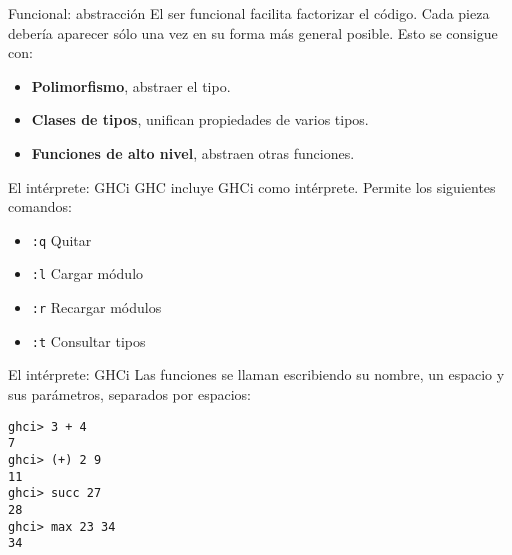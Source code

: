 \begin{frame}[fragile]{Funcional: abstracción}
  El ser funcional facilita factorizar el código. Cada
  pieza debería aparecer sólo una vez en su forma más
  general posible. Esto se consigue con:
  
  \begin{itemize}
   \item \textbf{Polimorfismo}, abstraer el tipo.
   \item \textbf{Clases de tipos}, unifican propiedades de varios tipos.
   \item \textbf{Funciones de alto nivel}, abstraen otras funciones.
  \end{itemize}

\end{frame}

\begin{frame}{El intérprete: GHCi}
  GHC incluye GHCi como intérprete. Permite los siguientes comandos:
  \espacio
  \begin{itemize}
    \item \texttt{:q} \qquad  Quitar
    \item \texttt{:l} \qquad  Cargar módulo
    \item \texttt{:r} \qquad  Recargar módulos
    \item \texttt{:t} \qquad  Consultar tipos
  \end{itemize}

\end{frame}

\begin{frame}[fragile]{El intérprete: GHCi}
 Las funciones se llaman escribiendo su nombre, un espacio y sus parámetros, separados por espacios:
\espacio
  \begin{lstlisting}
ghci> 3 + 4
7
ghci> (+) 2 9
11
ghci> succ 27
28
ghci> max 23 34
34
  \end{lstlisting}

\end{frame}
